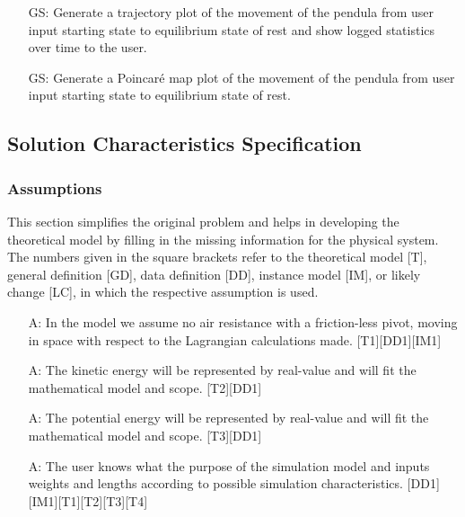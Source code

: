 \documentclass[12pt]{article}
\newcounter{assumpnum} %
\newcounter{goalnum} %
\begin{document}
\begin{itemize}
\item[GS\refstepcounter{goalnum}\thegoalnum:] Generate a trajectory plot of 
the movement of the pendula from user input starting state to equilibrium 
state of rest and show logged statistics over time to the user. 
\item[GS\refstepcounter{goalnum}\thegoalnum:] Generate a Poincaré map plot of 
the movement of the pendula from user input starting state to equilibrium 
state of rest.
\end{itemize}


\newpage

\subsection{Solution Characteristics Specification}

\subsubsection{Assumptions}

This section simplifies the original problem and helps in developing the
theoretical model by filling in the missing information for the physical
system. The numbers given in the square brackets refer to the theoretical model
[T], general definition [GD], data definition [DD], instance model [IM], or
likely change [LC], in which the respective assumption is used.

\begin{itemize}
\item[A\refstepcounter{assumpnum}\theassumpnum \label{A:equation}:]
In the model we assume no air resistance with a friction-less pivot, moving in
space with respect to the Lagrangian calculations made. [T1][DD1][IM1] 
\item[A\refstepcounter{assumpnum}\theassumpnum \label{A:kinetic}:]
  The kinetic energy will be represented by real-value and will fit the 
mathematical model and scope. [T2][DD1]
\item[A\refstepcounter{assumpnum}\theassumpnum \label{A:poten}:]
  The potential energy will be represented by real-value and will fit the 
mathematical model and scope. [T3][DD1]
\item[A\refstepcounter{assumpnum}\theassumpnum \label{A:init-user}:]
The user knows what the purpose of the simulation model and inputs weights and 
lengths according to possible simulation characteristics. 
[DD1][IM1][T1][T2][T3][T4]
\end{itemize}
\end{document}
